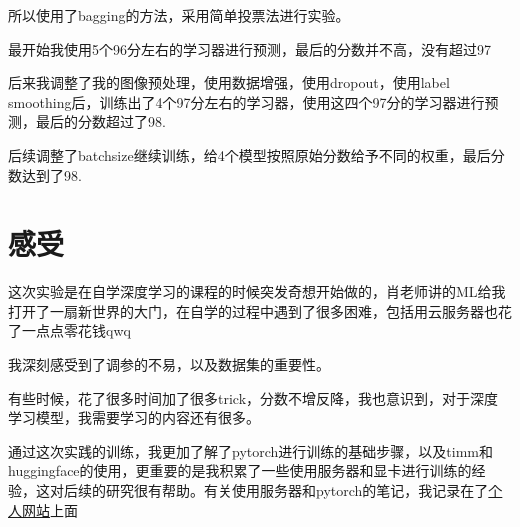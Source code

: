 \documentclass[12pt,a4paper,UTF8]{article}
\begin{document}
所以使用了bagging的方法，采用简单投票法进行实验。

最开始我使用5个96分左右的学习器进行预测，最后的分数并不高，没有超过97


后来我调整了我的图像预处理，使用数据增强，使用dropout，使用label smoothing后，训练出了4个97分左右的学习器，使用这四个97分的学习器进行预测，最后的分数超过了98.


后续调整了batchsize继续训练，给4个模型按照原始分数给予不同的权重，最后分数达到了98.

\section{感受}

这次实验是在自学深度学习的课程的时候突发奇想开始做的，肖老师讲的ML给我打开了一扇新世界的大门，在自学的过程中遇到了很多困难，包括用云服务器也花了一点点零花钱qwq

我深刻感受到了调参的不易，以及数据集的重要性。

有些时候，花了很多时间加了很多trick，分数不增反降，我也意识到，对于深度学习模型，我需要学习的内容还有很多。

通过这次实践的训练，我更加了解了pytorch进行训练的基础步骤，以及timm和huggingface的使用，更重要的是我积累了一些使用服务器和显卡进行训练的经验，这对后续的研究很有帮助。有关使用服务器和pytorch的笔记，我记录在了\href{https://www.philfan.cn/Robotics/Environment/System-server/#_13}{个人网站}上面
\end{document}
